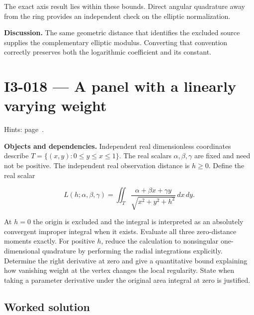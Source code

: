 \documentclass[11pt,oneside,openany]{book}
\begin{document}
The exact axis result lies within these bounds. Direct angular quadrature away from the ring provides an independent check on the elliptic normalization.

\textbf{Discussion.} The same geometric distance that identifies the excluded source supplies the complementary elliptic modulus. Converting that convention correctly preserves both the logarithmic coefficient and its constant.
\clearpage
\section{I3-018 --- A panel with a linearly varying weight}
\label{problem:I3-018}
{\small Hints: page~\pageref{hints:I3-018}.}\par\medskip

\textbf{Objects and dependencies.} Independent real dimensionless coordinates describe \(T=\{(x,y):0\le y\le x\le1\}\). The real scalars \(\alpha,\beta,\gamma\) are fixed and need not be positive. The independent real observation distance is \(h\ge0\). Define the real scalar

\[
L(h;\alpha,\beta,\gamma)=\iint_T
\frac{\alpha+\beta x+\gamma y}{\sqrt{x^2+y^2+h^2}}\,dx\,dy.
\]

At \(h=0\) the origin is excluded and the integral is interpreted as an absolutely convergent improper integral when it exists. Evaluate all three zero-distance moments exactly. For positive \(h\), reduce the calculation to nonsingular one-dimensional quadrature by performing the radial integrations explicitly. Determine the right derivative at zero and give a quantitative bound explaining how vanishing weight at the vertex changes the local regularity. State when taking a parameter derivative under the original area integral at zero is justified.
\subsection*{Worked solution}
\end{document}
